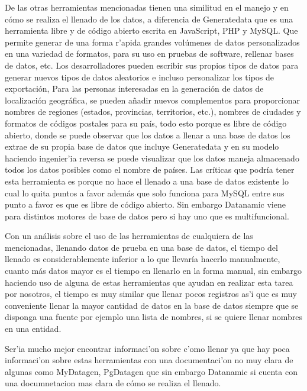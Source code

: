 De las otras herramientas mencionadas tienen una similitud en el manejo y en c\'omo se realiza el llenado de los datos, a diferencia de Generatedata que es una herramienta libre y de c\'odigo abierto escrita en JavaScript, PHP y MySQL. Que permite generar de una forma r'apida grandes vol\'umenes de datos personalizados en una variedad de formatos, para su uso en pruebas de software, rellenar bases de datos, etc. Los desarrolladores pueden escribir sus propios tipos de datos para generar nuevos tipos de datos aleatorios e incluso personalizar los tipos de exportaci\'on, Para las personas interesadas en la generaci\'on de datos de localizaci\'on geogr\'afica, se pueden a\~nadir nuevos complementos para proporcionar nombres de regiones (estados, provincias, territorios, etc.), nombres de ciudades y formatos de c\'odigos postales para su pa\'is, todo esto porque es libre de c\'odigo abierto, donde se puede observar que los datos a llenar a una base de datos los extrae de su propia base de datos que incluye Generatedata y en su modelo haciendo ingenier'ia reversa se puede visualizar que los datos maneja almacenado todos los datos posibles como el nombre de pa\'ises. Las cr\'iticas que podr\'ia tener esta herramienta es porque no hace el llenado a una base de datos existente lo cual lo quita puntos a favor adem\'as que solo funciona para MySQL entre sus punto a favor es que es libre de c\'odigo abierto. Sin embargo Datanamic viene para distintos motores de base de datos pero si hay uno que es multifuncional.

Con un an\'alisis sobre el uso de las herramientas de cualquiera de las mencionadas, llenando datos de prueba en una base de datos, el tiempo del llenado es considerablemente inferior a lo que llevar\'ia hacerlo manualmente, cuanto m\'as datos mayor es el tiempo en llenarlo en la forma manual, sin embargo haciendo uso de alguna de estas herramientas que ayudan en realizar esta tarea por nosotros, el tiempo es muy similar que llenar pocos registros as'i que es muy conveniente llenar la mayor cantidad de datos en la base de datos siempre que se disponga una fuente por ejemplo una lista de nombres, si se quiere llenar nombres en una entidad. 

Ser'ia mucho mejor encontrar informaci'on sobre c'omo llenar ya que hay poca informaci'on sobre estas herramientas con una documentaci'on no muy clara de algunas como MyDatagen, PgDatagen que sin embargo Datanamic si cuenta con una documnetacion mas clara \cite{datanamictutorial} de c\'omo se realiza el llenado. 

